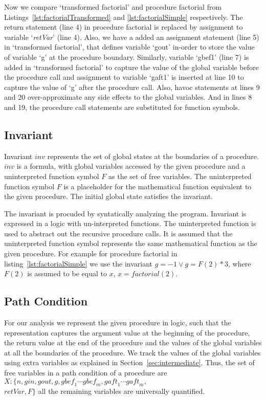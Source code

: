 \documentclass{llncs}
\newcommand{\inv}{\mathit{inv}}
\newcommand{\mi}[1]{\mathit{#1}}
\newcommand{\retVar}{\textit{retVar}}
\newcommand{\F}{\mathit{F}}
\newcommand{\gbef}{\textit{gbef}}
\newcommand{\gaft}{\textit{gaft}}
\begin{document}
Now we compare `transformed factorial' and procedure factorial from
Listings~\ref{lst:factorialTransformed} and \ref{lst:factorialSimple}
respectively. The return statement (line 4) in procedure factorial
is replaced by assignment to variable `\retVar' (line 4). Also, we
have a added an assignment statement (line 5) in `transformed
factorial', that defines variable `gout' in-order to store the value
of variable `g' at the procedure boundary. Similarly, variable `gbef1'
(line 7) is added in `transformed factorial' to capture the value of
the global variable before the procedure call and assignment to
variable `gaft1' is inserted at line 10 to capture the value of `g'
after the procedure call. Also, havoc statements at lines 9 and 20
over-approximate any side effects to the global variables. And in
lines 8 and 19, the procedure call statements are substituted for
function symbols.

\subsection{Invariant}\label{sec:invariant}

\begin{definition}[invariant]
  Invariant $\inv$ represents the set of
  global states at the boundaries of a procedure. $\inv$ is a formula,
  with global variables accessed by the given procedure and a
  uninterpreted function symbol $\F$ as the set of free variables. The
  uninterpreted function symbol $\F$ is a placeholder for the
  mathematical function equivalent to the given procedure. The initial
  global state satisfies the invariant.
\end{definition}

The invariant is procuded by syntatically analyzing the
program. Invariant is expressed in a logic with un-interpreted
functions. The uninterpreted function is used to abstract out the
recursive procedure calls. It is assumed that the uninterpreted
function symbol represents the same mathematical function as the given
procedure. For example for procedure factorial in
listing~\ref{lst:factorialSimple} we use the invariant $\mathit{g = -1
  \vee g = \F(2) * 3}$, where $\F(2)$ is assumed to be equal to $x$,
$x = \mi{factorial(2)}$.

\subsection{Path Condition}
For our analysis we represent the given procedure in logic, such that
the representation captures the argument value at the beginning of the
procedure, the return value at the end of the procedure and the values
of the global variables at all the boundaries of the procedure. We
track the values of the global variables using extra variables as
explained in Section~\ref{sec:intermediate}. Thus, the set of free
variables in a path condition of a procedure are $X : \mi{\{n, gin,
  gout, g, \gbef_1 \cdots \gbef_m, \gaft_1 \cdots \gaft_m,}$ \\ ${\retVar, \F
  \}}$ all the remaining variables are universally quantified.
\end{document}
